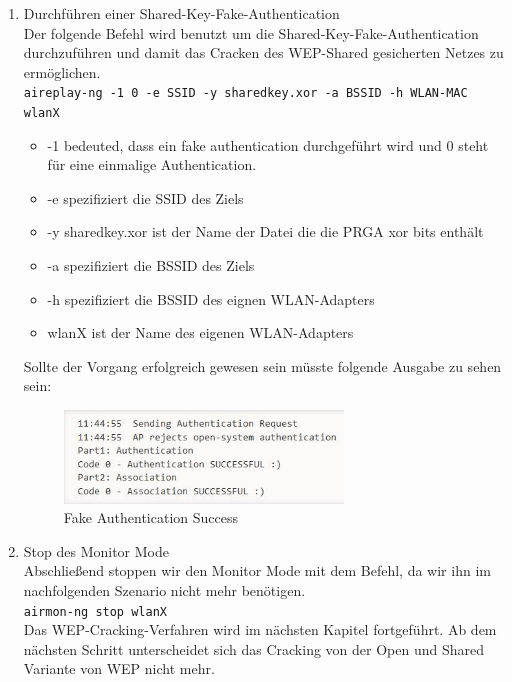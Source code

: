\begin{enumerate}
		\item Durchführen einer Shared-Key-Fake-Authentication \\
		Der folgende Befehl wird benutzt um die Shared-Key-Fake-Authentication durchzuführen und damit das Cracken des WEP-Shared gesicherten Netzes zu ermöglichen. \\
		\colorbox{altgray}{\lstinline|aireplay-ng -1 0 -e SSID -y sharedkey.xor -a BSSID -h WLAN-MAC wlanX|} \\
		\begin{itemize}
				\item -1 bedeuted, dass ein fake authentication durchgeführt wird und 0 steht für eine einmalige Authentication.
				\item -e spezifiziert die SSID des Ziels
				\item -y sharedkey.xor ist der Name der Datei die die PRGA xor bits enthält
				\item -a spezifiziert die BSSID des Ziels
				\item -h spezifiziert die BSSID des eignen WLAN-Adapters
				\item wlanX ist der Name des eigenen WLAN-Adapters
		\end{itemize}
		Sollte der Vorgang erfolgreich gewesen sein müsste folgende Ausgabe zu sehen sein:

		\begin{figure}[H]
			\centering
			\includegraphics[width=0.7\textwidth]{images/WLAN/sharedSuccess.JPG}
			\caption{Fake Authentication Success}
			\label{fig:Fake Authentication Success}
		\end{figure}

		\item Stop des Monitor Mode \\
		 Abschließend stoppen wir den Monitor Mode mit dem Befehl, da wir ihn im nachfolgenden Szenario nicht mehr benötigen. \\
		 \colorbox{altgray}{\lstinline|airmon-ng stop wlanX|} \\
		 Das WEP-Cracking-Verfahren wird im nächsten Kapitel fortgeführt. Ab dem nächsten Schritt unterscheidet sich das Cracking von der Open und Shared Variante von WEP nicht mehr.

	\end{enumerate}

